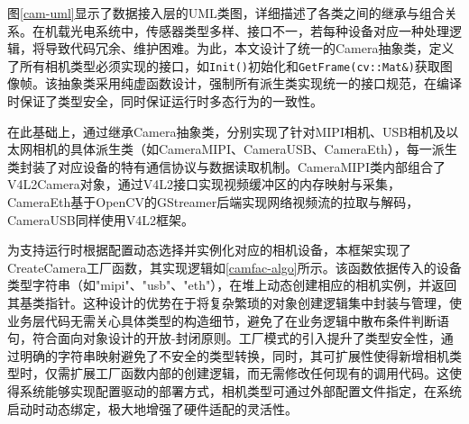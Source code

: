 图\ref{cam-uml}显示了数据接入层的UML类图，详细描述了各类之间的继承与组合关系。在机载光电系统中，传感器类型多样、接口不一，若每种设备对应一种处理逻辑，将导致代码冗余、维护困难。为此，本文设计了统一的Camera抽象类，定义了所有相机类型必须实现的接口，如\texttt{Init()}初始化和\texttt{GetFrame(cv::Mat\&)}获取图像帧。该抽象类采用纯虚函数设计，强制所有派生类实现统一的接口规范，在编译时保证了类型安全，同时保证运行时多态行为的一致性。


\begin{center}
\end{center}


在此基础上，通过继承Camera抽象类，分别实现了针对MIPI相机、USB相机及以太网相机的具体派生类（如CameraMIPI、CameraUSB、CameraEth），每一派生类封装了对应设备的特有通信协议与数据读取机制。CameraMIPI类内部组合了V4L2Camera对象，通过V4L2接口实现视频缓冲区的内存映射与采集，CameraEth基于OpenCV的GStreamer后端实现网络视频流的拉取与解码，CameraUSB同样使用V4L2框架。

为支持运行时根据配置动态选择并实例化对应的相机设备，本框架实现了CreateCamera工厂函数，其实现逻辑如\ref{camfac-algo}所示。该函数依据传入的设备类型字符串（如"mipi"、"usb"、"eth"），在堆上动态创建相应的相机实例，并返回其基类指针。这种设计的优势在于将复杂繁琐的对象创建逻辑集中封装与管理，使业务层代码无需关心具体类型的构造细节，避免了在业务逻辑中散布条件判断语句，符合面向对象设计的开放-封闭原则。工厂模式的引入提升了类型安全性，通过明确的字符串映射避免了不安全的类型转换，同时，其可扩展性使得新增相机类型时，仅需扩展工厂函数内部的创建逻辑，而无需修改任何现有的调用代码。这使得系统能够实现配置驱动的部署方式，相机类型可通过外部配置文件指定，在系统启动时动态绑定，极大地增强了硬件适配的灵活性。

